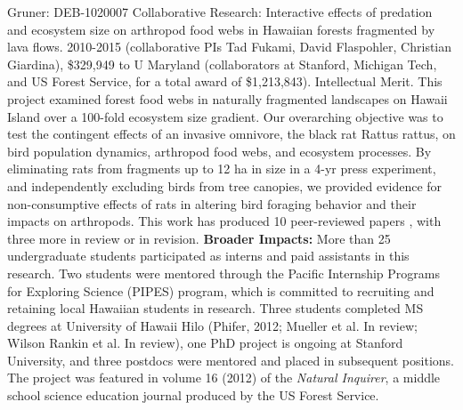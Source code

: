 \documentclass[11pt]{article}
\makeatletter
\renewcommand{\paragraph}{\@startsection{paragraph}{4}{\z@}
  {1ex \@plus 1ex \@minus .2ex}{-1em}
  {\normalfont\normalsize\it}
}
\makeatother
\begin{document}
\paragraph{Gruner:} DEB-1020007 Collaborative Research: Interactive
effects of predation and ecosystem size on arthropod food webs in
Hawaiian forests fragmented by lava flows. 2010-2015 (collaborative
PIs Tad Fukami, David Flaspohler, Christian Giardina), \$329,949 to U
Maryland (collaborators at Stanford, Michigan Tech, and US Forest
Service, for a total award of \$1,213,843). Intellectual Merit. This
project examined forest food webs in naturally fragmented landscapes
on Hawaii Island over a 100-fold ecosystem size gradient. Our
overarching objective was to test the contingent effects of an
invasive omnivore, the black rat Rattus rattus, on bird population
dynamics, arthropod food webs, and ecosystem processes. By eliminating
rats from fragments up to 12 ha in size in a 4-yr press experiment,
and independently excluding birds from tree canopies, we provided
evidence for non-consumptive effects of rats in altering bird foraging
behavior and their impacts on arthropods. This work has produced 10
peer-reviewed papers \citep{massol2011, vaughn2013, knowlton2014,
  vaughn2014, vaughn2015, knowlton2016, vannette2016}, with three more
in review or in revision. {\bf Broader Impacts:} More than 25
undergraduate students participated as interns and paid assistants in
this research. Two students were mentored through the Pacific
Internship Programs for Exploring Science (PIPES) program, which is
committed to recruiting and retaining local Hawaiian students in
research. Three students completed MS degrees at University of Hawaii
Hilo (Phifer, 2012; Mueller et al. In review; Wilson Rankin et al. In
review), one PhD project is ongoing at Stanford University, and three
postdocs were mentored and placed in subsequent positions. The project
was featured in volume 16 (2012) of the {\it Natural Inquirer}, a
middle school science education journal produced by the US Forest
Service.




\vbox{}
\end{document}
